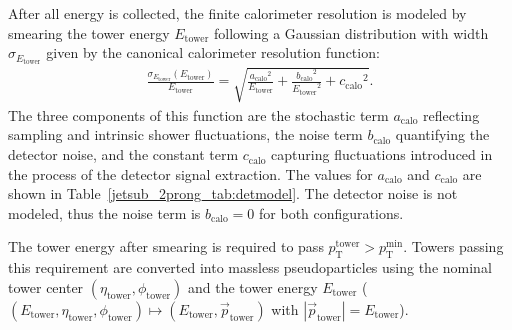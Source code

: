 \documentclass[11pt]{cernrep}
\begin{document}
After all energy is collected, the finite calorimeter resolution is modeled by smearing the tower energy \ensuremath{E_{\text{tower}}}{} following a Gaussian distribution with width 
$\sigma_{\ensuremath{E_{\text{tower}}}}$ given by the canonical calorimeter resolution function:
\begin{align}
  \frac{\sigma_{\ensuremath{E_{\text{tower}}}}(\ensuremath{E_{\text{tower}}})}{\ensuremath{E_{\text{tower}}}} = \sqrt{\frac{\ensuremath{a_{\text{calo}}}^{2}}{\ensuremath{E_{\text{tower}}}} + \frac{\ensuremath{b_{\text{calo}}}^2}{\ensuremath{E_{\text{tower}}}^{2}} + \ensuremath{c_{\text{calo}}}^{2}}.
  \label{jetsub_2prong_eq:caloreso}
\end{align}
The three components of this function are the stochastic term \ensuremath{a_{\text{calo}}}{} reflecting sampling and intrinsic shower fluctuations, the noise term \ensuremath{b_{\text{calo}}}{} quantifying the detector noise, 
and the constant term \ensuremath{c_{\text{calo}}}{} capturing fluctuations introduced in the process of the detector signal extraction.  
The values for \ensuremath{a_{\text{calo}}}{} and \ensuremath{c_{\text{calo}}}{} are shown in Table~\ref{jetsub_2prong_tab:detmodel}. 
The detector noise is not modeled, thus the noise term is $\ensuremath{b_{\text{calo}}}=0$ for both configurations.

The tower energy after smearing is required to pass $\ensuremath{p_{\text{T}}^{\text{tower}}} > \ensuremath{p_{\text{T}}^{\text{min}}}$. 
Towers passing this requirement are converted into massless pseudoparticles using the 
nominal tower center $(\ensuremath{\eta_{\text{tower}}},\ensuremath{\phi_{\text{tower}}})$ and the tower energy \ensuremath{E_{\text{tower}}}{} ($(\ensuremath{E_{\text{tower}}},\ensuremath{\eta_{\text{tower}}},\ensuremath{\phi_{\text{tower}}}) \mapsto (\ensuremath{E_{\text{tower}}},\vec{p}_{\text{tower}})$ with $|\vec{p}_{\text{tower}}| = \ensuremath{E_{\text{tower}}}$).
\end{document}
